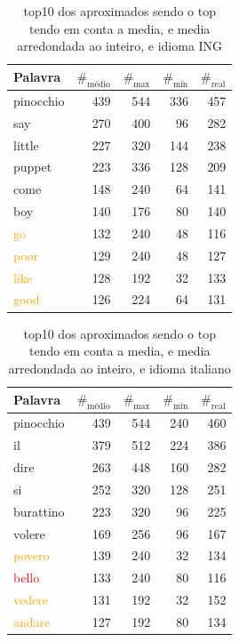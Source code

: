 \documentclass[mirror, portugues]{revdetua}
\begin{document}
\begin{table}[H]
\centering
\caption{top10 dos aproximados sendo o top tendo em conta a media, e media arredondada ao inteiro, e idioma ING}
\label{table:top10_aprox_ingles}
\begin{tabular}{lrrr|r}
\toprule
Palavra & $\text{\#}_{\text{médio}}$ & $\text{\#}_{\text{max}}$ & $\text{\#}_{\text{min}}$ & $\text{\#}_{\text{real}}$ \\
\midrule
pinocchio & 439 & 544 & 336 & 457 \\
say & 270 & 400 & 96 & 282 \\
little & 227 & 320 & 144 & 238 \\
puppet & 223 & 336 & 128 & 209 \\
come & 148 & 240 & 64 & 141 \\
boy & 140 & 176 & 80 & 140 \\
\textcolor{orange}{go} & 132 & 240 & 48 & 116 \\
\textcolor{orange}{poor} & 129 & 240 & 48 & 127 \\
\textcolor{orange}{like} & 128 & 192 & 32 & 133 \\
\textcolor{orange}{good} & 126 & 224 & 64 & 131 \\
\bottomrule
\end{tabular}
\end{table}

\begin{table}[H]
\centering
\caption{top10 dos aproximados sendo o top tendo em conta a media, e media arredondada ao inteiro, e idioma italiano}
\label{table:top10_aprox_italiano}
\begin{tabular}{lrrr|r}
\toprule
Palavra & $\text{\#}_{\text{médio}}$ & $\text{\#}_{\text{max}}$ & $\text{\#}_{\text{min}}$ & $\text{\#}_{\text{real}}$ \\
\midrule
pinocchio & 439 & 544 & 240 & 460 \\
il & 379 & 512 & 224 & 386 \\
dire & 263 & 448 & 160 & 282 \\
si & 252 & 320 & 128 & 251 \\
burattino & 223 & 320 & 96 & 225 \\
volere & 169 & 256 & 96 & 167 \\
\textcolor{orange}{povero} & 139 & 240 & 32 & 134 \\
\textcolor{red}{bello} & 133 & 240 & 80 & 116 \\
\textcolor{orange}{vedere} & 131 & 192 & 32 & 152 \\
\textcolor{orange}{andare} & 127 & 192 & 80 & 134 \\
\bottomrule
\end{tabular}
\end{table}
\end{document}
